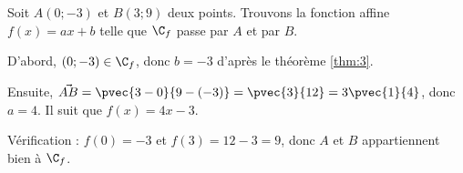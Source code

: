 \begin{exemple}
	Soit $A(0;-3)$ et $B(3 ; 9)$ deux points.
	Trouvons la fonction affine $f(x) = ax+b$ telle que $\C_f$ passe par $A$ et par $B$.
	
	D'abord, $(0;-3) \in \C_f$, donc $b=-3$ d'après le théorème \ref{thm:3}.
	
	Ensuite, $\vec{AB} = \pvec{3-0}{9-(-3)} = \pvec{3}{12} = 3 \pvec{1}{4}$,
	donc $a = 4$.
	Il suit que $f(x) = 4x-3$.
	
	Vérification : $f(0) = -3$ et $f(3) = 12-3 = 9$, donc $A$ et $B$ appartiennent bien à $\C_f$.
\end{exemple}

\newpage 

